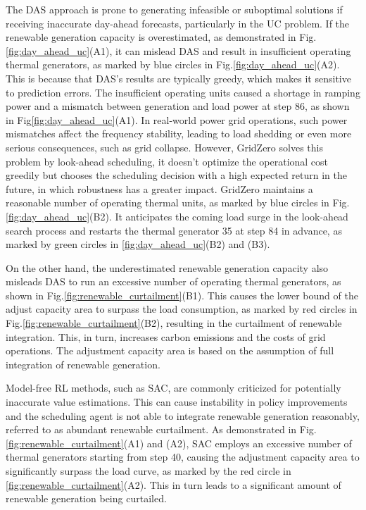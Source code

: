 The DAS approach is prone to generating infeasible or suboptimal solutions if receiving inaccurate day-ahead forecasts, particularly in the UC problem.
If the renewable generation capacity is overestimated, as demonstrated in Fig.\ref{fig:day_ahead_uc}(A1), it can mislead DAS and result in insufficient operating thermal generators, as marked by blue circles in Fig.\ref{fig:day_ahead_uc}(A2). This is because that DAS's results are typically greedy, which makes it sensitive to prediction errors. The insufficient operating units caused a shortage in ramping power and a mismatch between generation and load power at step 86, as shown in Fig\ref{fig:day_ahead_uc}(A1). In real-world power grid operations, such power mismatches affect the frequency stability, leading to load shedding or even more serious consequences, such as grid collapse\cite{enwiki:1103904998}. However, GridZero solves this problem by look-ahead scheduling, it doesn't optimize the operational cost greedily but chooses the scheduling decision with a high expected return in the future, in which robustness has a greater impact. GridZero maintains a reasonable number of operating thermal units, as marked by blue circles in Fig.\ref{fig:day_ahead_uc}(B2). It anticipates the coming load surge in the look-ahead search process and restarts the thermal generator 35 at step 84 in advance, as marked by green circles in \ref{fig:day_ahead_uc}(B2) and (B3).

On the other hand, the underestimated renewable generation capacity also misleads DAS to run an excessive number of operating thermal generators, as shown in Fig.\ref{fig:renewable_curtailment}(B1). This causes the lower bound of the adjust capacity area to surpass the load consumption, as marked by red circles in Fig.\ref{fig:renewable_curtailment}(B2), resulting in the curtailment of renewable integration. This, in turn, increases carbon emissions and the costs of grid operations. 
The adjustment capacity area is based on the assumption of full integration of renewable generation.

Model-free RL methods, such as SAC, are commonly criticized for potentially inaccurate value estimations. This can cause instability in policy improvements and the scheduling agent is not able to integrate renewable generation reasonably, referred to as abundant renewable curtailment. As demonstrated in Fig.\ref{fig:renewable_curtailment}(A1) and (A2), SAC employs an excessive number of thermal generators starting from step 40, causing the adjustment capacity area to significantly surpass the load curve, as marked by the red circle in \ref{fig:renewable_curtailment}(A2). This in turn leads to a significant amount of renewable generation being curtailed.

